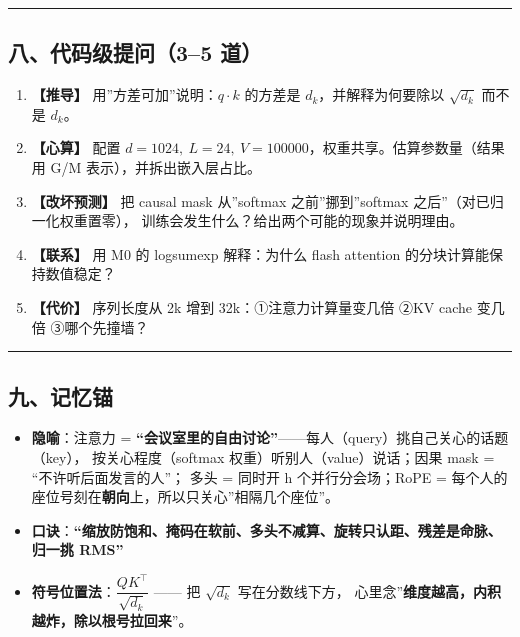 \documentclass[
  chinese,
  11pt,
]{ctexart}
\providecommand{\tightlist}{%
  \setlength{\itemsep}{0pt}\setlength{\parskip}{0pt}}
\begin{document}
\begin{center}\rule{0.5\linewidth}{0.5pt}\end{center}

\subsection{八、代码级提问（3--5 道）}\label{ux516bux4ee3ux7801ux7ea7ux63d0ux95ee35-ux9053}

\begin{enumerate}
\def\labelenumi{\arabic{enumi}.}
\tightlist
\item
  \textbf{【推导】} 用''方差可加''说明：\(q\cdot k\) 的方差是 \(d_k\)，并解释为何要除以 \(\sqrt{d_k}\) 而不是 \(d_k\)。
\item
  \textbf{【心算】} 配置 \(d=1024,\ L=24,\ V=100000\)，权重共享。估算参数量（结果用 G/M 表示），并拆出嵌入层占比。
\item
  \textbf{【改坏预测】} 把 causal mask 从''softmax 之前''挪到''softmax 之后''（对已归一化权重置零）， 训练会发生什么？给出两个可能的现象并说明理由。
\item
  \textbf{【联系】} 用 M0 的 logsumexp 解释：为什么 flash attention 的分块计算能保持数值稳定？
\item
  \textbf{【代价】} 序列长度从 2k 增到 32k：①注意力计算量变几倍 ②KV cache 变几倍 ③哪个先撞墙？
\end{enumerate}

\begin{center}\rule{0.5\linewidth}{0.5pt}\end{center}

\subsection{九、记忆锚}\label{ux4e5dux8bb0ux5fc6ux951a}

\begin{itemize}
\tightlist
\item
  \textbf{隐喻}：注意力 = \textbf{``会议室里的自由讨论''}------每人（query）挑自己关心的话题（key）， 按关心程度（softmax 权重）听别人（value）说话；因果 mask = ``不许听后面发言的人''； 多头 = 同时开 h 个并行分会场；RoPE = 每个人的座位号刻在\textbf{朝向}上，所以只关心''相隔几个座位''。
\item
  \textbf{口诀}：\textbf{``缩放防饱和、掩码在软前、多头不减算、旋转只认距、残差是命脉、归一挑 RMS''}
\item
  \textbf{符号位置法}：\(\dfrac{QK^\top}{\sqrt{d_k}}\) ------ 把 \(\sqrt{d_k}\) 写在分数线下方， 心里念''\textbf{维度越高，内积越炸，除以根号拉回来}''。
\end{itemize}
\end{document}
